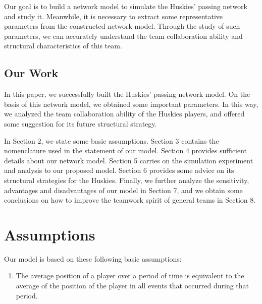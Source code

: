 \documentclass{mcmthesis}
\begin{document}
	Our goal is to build a network model to simulate the Huskies' passing network and study it.  Meanwhile, it is necessary to extract some representative parameters from the constructed network model.  Through the study of such parameters, we can accurately understand the team collaboration ability and structural characteristics of this team.
\subsection{Our Work}
	In this paper, we successfully built the Huskies' passing network model.  On the basis of this network model, we obtained some important parameters. In this way, we analyzed the team collaboration ability of the Huskies players, and offered some suggestion for its future structural strategy.

	In Section 2, we state some basic assumptions.  Section 3 contains the nomenclature used in the statement of our model.  Section 4 provides sufficient details about our network model.  Section 5 carries on the simulation experiment and analysis to our proposed model.  Section 6 provides some advice on its structural strategies for the Huskies.  Finally, we further analyze the sensitivity, advantages and disadvantages of our model in Section 7, and we obtain some conclusions on how to improve the teamwork spirit of general teams in Section 8.
\section{Assumptions}
	Our model is based on these following basic assumptions:
	\begin{enumerate}
		\item The average position of a player over a period of time is equivalent to the average of the position of the player in all events that occurred during that period.
	\end{enumerate}
\end{document}
